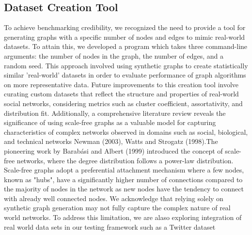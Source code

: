 \documentclass[letterpaper, 10pt]{article}
\begin{document}
\begin{multicols}{2}
    \section{Dataset Creation Tool}\label{section:datasetCreation}
        To achieve benchmarking credibility, we recognized the need to provide a tool for generating graphs with a specific number of nodes and edges to mimic real-world datasets. To attain this, we developed a program which takes three command-line arguments: the number of nodes in the graph, the number of edges, and a random seed. This approach involved using synthetic graphs to create statistically similar 'real-world' datasets in order to evaluate performance of graph algorithms on more representative data. Future improvements to this creation tool involve curating custom datasets that reflect the structure and properties of real-world social networks, considering metrics such as cluster coefficient, assortativity, and distribution fit. Additionally, a comprehensive literature review reveals the significance of using scale-free graphs as a valuable model for capturing characteristics of complex networks observed in domains such as social, biological, and technical networks Newman (2003), Watts and Strogatz (1998).The pioneering work by Barabási and Albert (1999) introduced the concept of scale-free networks, where the degree distribution follows a power-law distribution. Scale-free graphs adopt a preferential attachment mechanism where a few nodes, known as "hubs", have a significantly higher number of connections compared to the majority of nodes in the network as new nodes have the tendency to connect with already well connected nodes.  
        We acknowledge that relying solely on synthetic graph generation may not fully capture the complex nature of real world networks. To address this limitation, we are alaso exploring integration of real world data sets in our testing framework such as a Twitter dataset 
        

\end{multicols}
\end{document}
